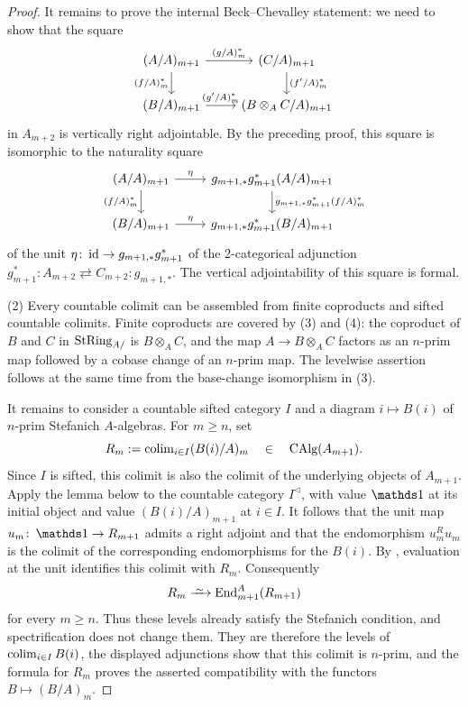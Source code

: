 \documentclass[11pt]{book}
\begin{document}
\begin{proof}
		It remains to prove the internal Beck--Chevalley statement: we need to show that the square
		\[
		\begin{tikzcd}
			(A/A)_{m+1} \dar[swap]{(f/A)^*_m} \rar{(g/A)^*_m} & (C/A)_{m+1} \dar{(f'/A)^*_m} \\
			(B/A)_{m+1} \rar{(g'/A)^*_m} & (B \otimes_A C/A)_{m+1}
		\end{tikzcd}
		\]
		in $A_{m+2}$ is vertically right adjointable. By the preceding proof, this square is isomorphic to the naturality square
		\[
		\begin{tikzcd}
			(A/A)_{m+1} \dar[swap]{(f/A)^*_m} \rar{\eta} & g_{m+1,*}g^*_{m+1}(A/A)_{m+1} \dar{g_{m+1,*}g^*_{m+1}(f/A)^*_m} \\
			(B/A)_{m+1} \rar{\eta} & g_{m+1,*}g^*_{m+1}(B/A)_{m+1}
		\end{tikzcd}
		\]
		of the unit $\eta\colon \operatorname{id} \to g_{m+1,*}g^*_{m+1}$ of the 2-categorical adjunction $g_{m+1}^*\colon A_{m+2} \rightleftarrows C_{m+2}: g_{m+1,*}$. The vertical adjointability of this square is formal.

		(2) Every countable colimit can be assembled from finite coproducts and sifted countable colimits. Finite coproducts are covered by (3) and (4): the coproduct of $B$ and $C$ in ${\textup{StRing}}_{A/}$ is $B \otimes_A C$, and the map $A \to B \otimes_A C$ factors as an $n$-prim map followed by a cobase change of an $n$-prim map. The levelwise assertion follows at the same time from the base-change isomorphism in (3).

		It remains to consider a countable sifted category $I$ and a diagram $i \mapsto B(i)$ of $n$-prim Stefanich $A$-algebras. For $m \geq n$, set
		\[
			R_m := \operatorname{colim}_{i \in I}(B(i)/A)_m \quad\in\quad {\textup{CAlg}}(A_{m+1}).
		\]
		Since $I$ is sifted, this colimit is also the colimit of the underlying objects of $A_{m+1}$. Apply the lemma below to the countable category $I^{\lhd}$, with value $\unit$ at its initial object and value $(B(i)/A)_{m+1}$ at $i \in I$. It follows that the unit map $u_m\colon \unit \to R_{m+1}$ admits a right adjoint and that the endomorphism $u_m^R u_m$ is the colimit of the corresponding endomorphisms for the $B(i)$. By , evaluation at the unit identifies this colimit with $R_m$. Consequently
		\[
			R_m \iso \End^A_{m+1}(R_{m+1})
		\]
		for every $m \geq n$. Thus these levels already satisfy the Stefanich condition, and spectrification does not change them. They are therefore the levels of $\operatorname{colim}_{i \in I}B(i)$, the displayed adjunctions show that this colimit is $n$-prim, and the formula for $R_m$ proves the asserted compatibility with the functors $B \mapsto (B/A)_m$.
	\end{proof}
\end{document}
